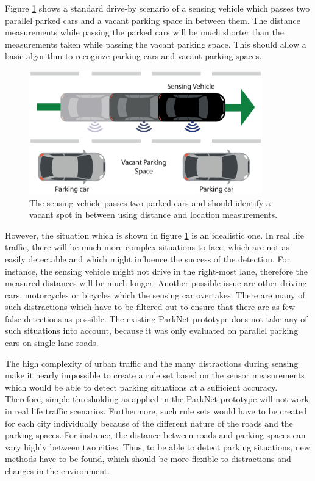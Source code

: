Figure \ref{fig:driveby_standard_parking_situation} shows a standard drive-by scenario of a sensing vehicle which passes two parallel parked cars and a vacant parking space in between them. The distance measurements while passing the parked cars will be much shorter than the measurements taken while passing the vacant parking space. This should allow a basic algorithm to recognize parking cars and vacant parking spaces.

\begin{figure}
	\centering
	\includegraphics[width=0.9\textwidth]{img/drive-by-parking-situation-pictogram.eps}
	\caption{The sensing vehicle passes two parked cars and should identify a vacant spot in between using distance and location measurements. }
	\label{fig:driveby_standard_parking_situation}
\end{figure}

However, the situation which is shown in figure \ref{fig:driveby_standard_parking_situation} is an idealistic one. In real life traffic, there will be much more complex situations to face, which are not as easily detectable and which might influence the success of the detection. For instance, the sensing vehicle might not drive in the right-most lane, therefore the measured distances will be much longer. Another possible issue are other driving cars, motorcycles or bicycles which the sensing car overtakes. There are many of such distractions which have to be filtered out to ensure that there are as few false detections as possible. 
The existing ParkNet prototype does not take any of such situations into account, because it was only evaluated on parallel parking cars on single lane roads.

The high complexity of urban traffic and the many distractions during sensing make it nearly impossible to create a rule set based on the sensor measurements which would be able to detect parking situations at a sufficient accuracy. Therefore, simple thresholding as applied in the ParkNet prototype will not work in real life traffic scenarios. Furthermore, such rule sets would have to be created for each city individually because of the different nature of the roads and the parking spaces. For instance, the distance between roads and parking spaces can vary highly between two cities. Thus, to be able to detect parking situations, new methods have to be found, which should be more flexible to distractions and changes in the environment.

